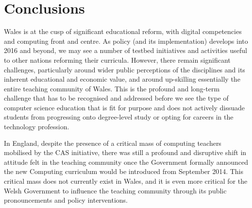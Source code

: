 \documentclass{llncs}
\begin{document}
\section{Conclusions}\label{conclusions}


Wales is at the cusp of significant educational reform, with digital
competencies and computing front and centre. As policy (and its
implementation) develops into 2016 and beyond, we may see a number of
testbed initiatives and activities useful to other nations reforming
their curricula.
However, there remain significant challenges, particularly
around wider public perceptions of the disciplines and its inherent
educational and economic value, and around up-skilling
essentially the entire teaching community of Wales. This is the
profound and long-term challenge that has to be recognised and
addressed before we see the type of computer science education that is
fit for purpose and does not actively dissuade students from
progressing onto degree-level study or opting for careers in the
technology profession.

In England, despite the presence of a critical mass of computing
teachers mobilised by the CAS initiative, there was still a profound
and disruptive shift in attitude felt in the teaching community once
the Government formally announced the new Computing curriculum would
be introduced from September 2014.  This critical mass does not
currently exist in Wales, and it is even more critical for the Welsh
Government to influence the teaching community through its public
pronouncements and policy interventions.
\end{document}
